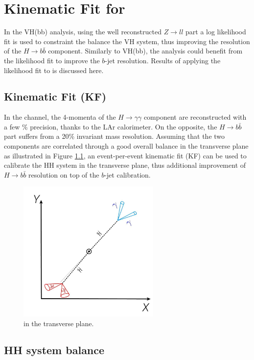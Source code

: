 \chapter{Kinematic Fit for \HHyybb}
\label{Adx4}

In the VH(bb) analysis, using the well reconstructed $Z\to ll$ part a log likelihood fit is used to constraint the balance the VH system, thus improving the resolution of the $H\to b\bar{b}$ component. Similarly to VH(bb), the \HHyybb analysis could benefit from the likelihood fit to improve the $b$-jet resolution. Results of applying the likelihood fit to \HHyybb is discussed here.

\section{Kinematic Fit (KF)}
In the \HHyybb channel, the 4-momenta of the $H\to\gamma\gamma$ component are reconstructed with a few \% precision, thanks to the LAr calorimeter. On the opposite, the $H\to b\bar{b}$ part suffers from a 20\% invariant mass resolution. Assuming that the two components are correlated through a good overall balance in the transverse plane as illustrated in Figure \ref{fig:Adx4:HH}, an event-per-event kinematic fit (KF) can be used to calibrate the HH system in the transverse plane, thus additional improvement of $H\to b\bar{b}$ resolution on top of the $b$-jet calibration.
\begin{figure}[H]
    \centering
    \includegraphics[width=7cm,height=7cm]{Adx/Adx4/Img/HH.png}
    \begin{tcolorbox}[colback=black!5!white,colframe=white!75!black]
    \caption{\HHyybb in the transverse plane.}
    \label{fig:Adx4:HH}
    \end{tcolorbox}

\end{figure}
\section{HH system balance}

